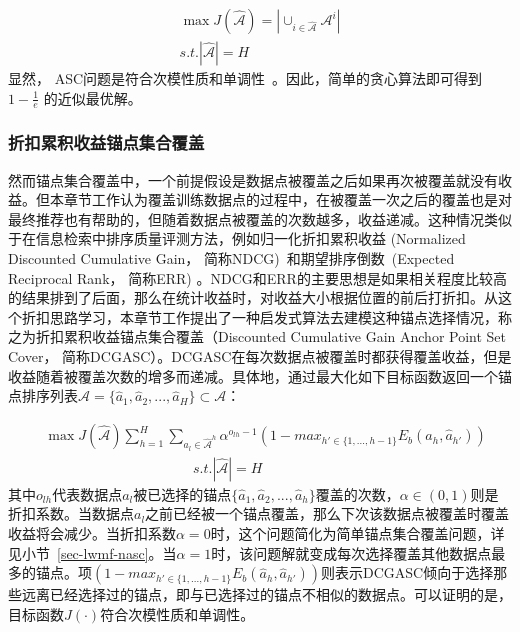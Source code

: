 \begin{eqnarray}
\max J(\hat{\mathcal{A}})=|\cup_{i\in \hat{\mathcal{A}}}\mathcal{A}^i| \nonumber \\
s.t. |\hat{\mathcal{A}}| = H
\end{eqnarray}
显然， ASC问题是符合次模性质和单调性~\cite{guillory2010interactive}。因此，简单的贪心算法即可得到$1-\frac{1}{e}$ 的近似最优解。

\subsubsection{折扣累积收益锚点集合覆盖}
然而锚点集合覆盖中，一个前提假设是数据点被覆盖之后如果再次被覆盖就没有收益。但本章节工作认为覆盖训练数据点的过程中，在被覆盖一次之后的覆盖也是对最终推荐也有帮助的，但随着数据点被覆盖的次数越多，收益递减。这种情况类似于在信息检索中排序质量评测方法，例如归一化折扣累积收益 (Normalized Discounted Cumulative Gain， 简称NDCG)~\cite{jarvelin2002cumulated,clarke2008novelty}和期望排序倒数~(Expected Reciprocal Rank， 简称ERR) \cite{chapelle2009expected}。NDCG和ERR的主要思想是如果相关程度比较高的结果排到了后面，那么在统计收益时，对收益大小根据位置的前后打折扣。从这个折扣思路学习，本章节工作提出了一种启发式算法去建模这种锚点选择情况，称之为折扣累积收益锚点集合覆盖（Discounted Cumulative Gain Anchor Point Set Cover， 简称DCGASC）。DCGASC在每次数据点被覆盖时都获得覆盖收益，但是收益随着被覆盖次数的增多而递减。具体地，通过最大化如下目标函数返回一个锚点排序列表$\hat{\mathcal{A}} = \{\hat{a}_{1},\hat{a}_{2},...,\hat{a}_{H}\} \subset \mathcal{A}$：

\begin{align}
\label{equ-lwmf-dcgasc}
&\max J(\hat{\mathcal{A}}) \sum_{h=1}^{H}\sum_{a_l \in \hat{\mathcal{A}}^{h}}\alpha^{o_{lh}-1}(1-max_{h'\in\{1,...,h-1\}} E_b(\hat{a}_{h}, \hat{a}_{h'})) \nonumber \\
&\ \ \ \ \ \ \ \ \ \ \ \ \ \ \ \ \ \ \ \ \ \ \ \ \ \ \ \ \ \ \ \ \ \ \ \ \ \ \ \ \ \ \ \ \ \ \ \ s.t. |\hat{\mathcal{A}}| = H
\end{align}
其中$o_{lh}$代表数据点$a_l$被已选择的锚点$\{\hat{a}_1,\hat{a}_2,...,\hat{a}_h\}$覆盖的次数，$\alpha \in (0,1)$则是折扣系数。当数据点$a_l$之前已经被一个锚点覆盖，那么下次该数据点被覆盖时覆盖收益将会减少。当折扣系数$\alpha = 0$时，这个问题简化为简单锚点集合覆盖问题，详见小节~\ref{sec-lwmf-nasc}。当$\alpha = 1$时，该问题解就变成每次选择覆盖其他数据点最多的锚点。项$(1-max_{h'\in\{1,...,h-1\}} E_b(\hat{a}_{h}, \hat{a}_{h'}))$则表示DCGASC倾向于选择那些远离已经选择过的锚点，即与已选择过的锚点不相似的数据点。可以证明的是，目标函数$J(\cdot)$符合次模性质和单调性。

